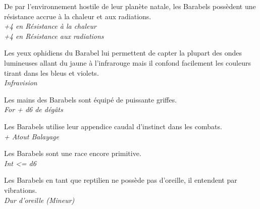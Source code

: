 \begin{description}[align=left]
\item [Enfance difficile] 	%
		De par l’environnement hostile de leur planète natale, les Barabels possèdent une résistance accrue à la chaleur et aux radiations.\\
		\emph{+4 en Résistance à la chaleur}\\
		\emph{+4 en Résistance aux radiations}
\item [\OE{il} Ophidien] 	%
		Les yeux ophidiens du Barabel lui permettent de capter la plupart des ondes lumineuses allant du jaune à l’infrarouge mais il confond facilement les couleurs tirant dans les bleus et violets.\\
		\emph{Infravision}
\item [Arme naturelle]		%
		Les mains des Barabels sont équipé de puissante griffes.\\
		\emph{For + d6 de dégâts}
\item [Balayage]			%
		Les Barabels utilise leur appendice caudal d’instinct dans les combats.\\
		\emph{+ Atout Balayage}
\item [Primitif]			%
		Les Barabels sont une race encore primitive.\\
		\emph{Int <= d6}
\item [Dur d’oreille]		%
		Les Barabels en tant que reptilien ne possède pas d’oreille, il entendent par vibrations.\\
		\emph{Dur d’oreille (Mineur)}
\end{description}